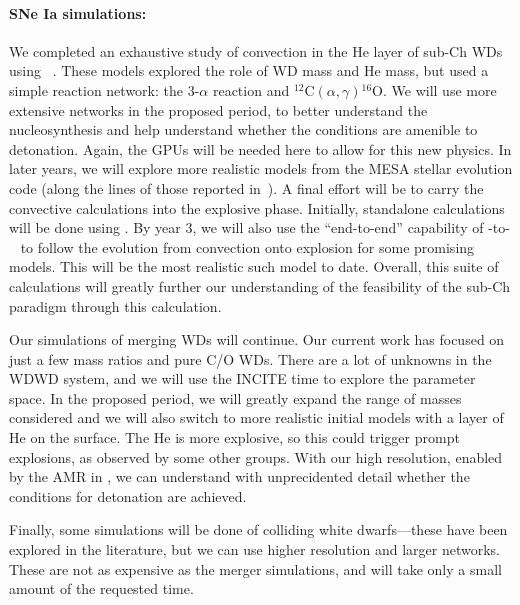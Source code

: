 \paragraph{SNe Ia simulations: }  
%
We completed an exhaustive study of convection in the He layer of
sub-Ch WDs using \maestro~\cite{jacobs:2016}.  These models explored
the role of WD mass and He mass, but used a simple reaction network:
the 3-$\alpha$ reaction and $^{12}\mathrm{C}
(\alpha,\gamma){}^{16}\mathrm{O}$.  We will use more extensive
networks in the proposed period, to better understand the
nucleosynthesis and help understand whether the conditions are
amenible to detonation.  Again, the GPUs will be needed here to allow
for this new physics.  In later years, we will explore more realistic
models from the MESA stellar evolution code (along the lines of those
reported in~\cite{brooks:2015}).  A final effort will be to carry the
convective calculations into the explosive phase.  Initially,
standalone calculations will be done using \flash{}.  By year 3, we will also use the ``end-to-end'' capability
of \maestro-to-\castro~\cite{Mal14} to follow the evolution from
convection onto explosion for some promising models.  This will be the
most realistic such model to date.  Overall, this suite of
calculations will greatly further our understanding of the feasibility
of the sub-Ch paradigm through this calculation.

Our simulations of merging WDs will continue.  Our current work has
focused on just a few mass ratios and pure C/O WDs.  There are a lot
of unknowns in the WDWD system, and we will use the INCITE time to
explore the parameter space.  In the proposed period, we will greatly
expand the range of masses considered and we will also switch to more
realistic initial models with a layer of He on the surface.  The He is
more explosive, so this could trigger prompt explosions, as observed
by some other groups.  With our high resolution, enabled by the AMR in
\castro, we can understand with unprecidented detail whether the
conditions for detonation are achieved.  

Finally, some simulations will be done of colliding white
dwarfs---these have been explored in the literature, but we can use
higher resolution and larger networks.  These are not as expensive as
the merger simulations, and will take only a small amount of the
requested time.


